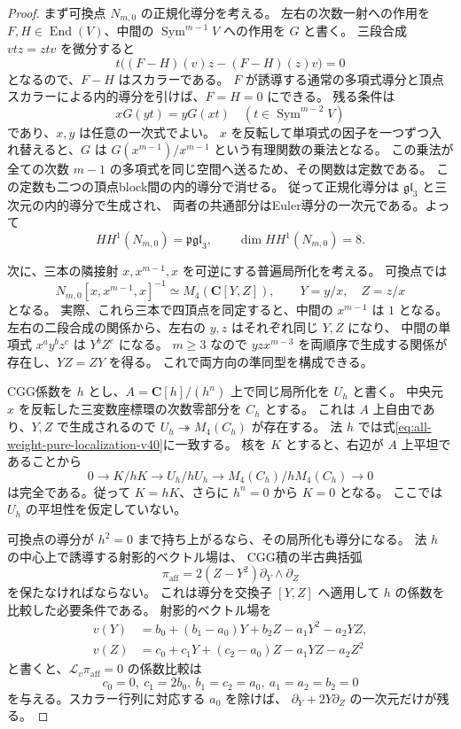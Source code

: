 \begin{proof}
まず可換点 $N_{m,0}$ の正規化導分を考える。
左右の次数一射への作用を $F,H\in\operatorname{End}(V)$、中間の
$\operatorname{Sym}^{m-1}V$ への作用を $G$ と書く。
三段合成 $vtz=ztv$ を微分すると
\[
 t\bigl((F-H)(v)z-(F-H)(z)v\bigr)=0
\]
となるので、$F-H$ はスカラーである。
$F$ が誘導する通常の多項式導分と頂点スカラーによる内的導分を引けば、$F=H=0$ にできる。
残る条件は
\[
 xG(yt)=yG(xt)\quad(t\in\operatorname{Sym}^{m-2}V)
\]
であり、$x,y$ は任意の一次式でよい。
$x$ を反転して単項式の因子を一つずつ入れ替えると、$G$ は
$G(x^{m-1})/x^{m-1}$ という有理関数の乗法となる。
この乗法が全ての次数 $m-1$ の多項式を同じ空間へ送るため、その関数は定数である。
この定数も二つの頂点block間の内的導分で消せる。
従って正規化導分は $\mathfrak{gl}_3$ と三次元の内的導分で生成され、
両者の共通部分はEuler導分の一次元である。よって
\[
 HH^1(N_{m,0})=\mathfrak{pgl}_3,\qquad \dim HH^1(N_{m,0})=8.
\]

次に、三本の隣接射 $x,x^{m-1},x$ を可逆にする普遍局所化を考える。
可換点では
\begin{equation}
 N_{m,0}[x,x^{m-1},x]^{-1}\simeq M_4(\mathbf C[Y,Z]),
 \qquad Y=y/x,\quad Z=z/x
 \label{eq:all-weight-pure-localization-v40}
\end{equation}
となる。
実際、これら三本で四頂点を同定すると、中間の $x^{m-1}$ は $1$ となる。
左右の二段合成の関係から、左右の $y,z$ はそれぞれ同じ $Y,Z$ になり、
中間の単項式 $x^ay^bz^c$ は $Y^bZ^c$ になる。
$m\ge3$ なので $yzx^{m-3}$ を両順序で生成する関係が存在し、$YZ=ZY$ を得る。
これで両方向の準同型を構成できる。

CGG係数を $h$ とし、$A=\mathbf C[h]/(h^n)$ 上で同じ局所化を $U_h$ と書く。
中央元 $x$ を反転した三変数座標環の次数零部分を $C_h$ とする。
これは $A$ 上自由であり、$Y,Z$ で生成されるので
$U_h\twoheadrightarrow M_4(C_h)$ が存在する。
法 $h$ では式\eqref{eq:all-weight-pure-localization-v40}に一致する。
核を $K$ とすると、右辺が $A$ 上平坦であることから
\[
 0\longrightarrow K/hK\longrightarrow U_h/hU_h
  \longrightarrow M_4(C_h)/hM_4(C_h)\longrightarrow0
\]
は完全である。従って $K=hK$、さらに $h^n=0$ から $K=0$ となる。
ここでは $U_h$ の平坦性を仮定していない。

可換点の導分が $h^2=0$ まで持ち上がるなら、その局所化も導分になる。
法 $h$ の中心上で誘導する射影的ベクトル場は、
CGG積の半古典括弧
\[
 \pi_{\mathrm{aff}}=2(Z-Y^2)\partial_Y\wedge\partial_Z
\]
を保たなければならない。
これは導分を交換子 $[Y,Z]$ へ適用して $h$ の係数を比較した必要条件である。
射影的ベクトル場を
\[
 \begin{split}
 v(Y)&=b_0+(b_1-a_0)Y+b_2Z-a_1Y^2-a_2YZ,\\
 v(Z)&=c_0+c_1Y+(c_2-a_0)Z-a_1YZ-a_2Z^2
 \end{split}
\]
と書くと、$\mathcal L_v\pi_{\mathrm{aff}}=0$ の係数比較は
\[
 c_0=0,\ c_1=2b_0,\ b_1=c_2=a_0,\ a_1=a_2=b_2=0
\]
を与える。スカラー行列に対応する $a_0$ を除けば、
$\partial_Y+2Y\partial_Z$ の一次元だけが残る。


\end{proof}
